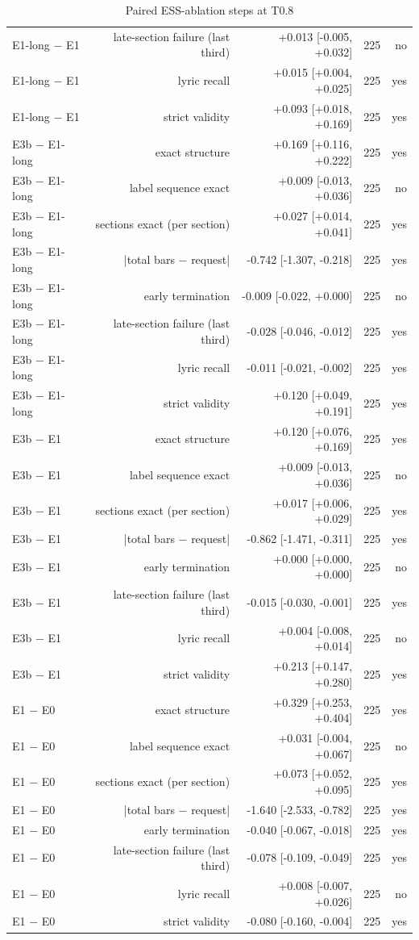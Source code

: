 \begin{table}[t]
\begin{tabular}{lrrrr}
E1-long $-$ E1 & late-section failure (last third) & +0.013 [-0.005, +0.032] & 225 & no \\
E1-long $-$ E1 & lyric recall & +0.015 [+0.004, +0.025] & 225 & yes \\
E1-long $-$ E1 & strict validity & +0.093 [+0.018, +0.169] & 225 & yes \\
E3b $-$ E1-long & exact structure & +0.169 [+0.116, +0.222] & 225 & yes \\
E3b $-$ E1-long & label sequence exact & +0.009 [-0.013, +0.036] & 225 & no \\
E3b $-$ E1-long & sections exact (per section) & +0.027 [+0.014, +0.041] & 225 & yes \\
E3b $-$ E1-long & |total bars $-$ request| & -0.742 [-1.307, -0.218] & 225 & yes \\
E3b $-$ E1-long & early termination & -0.009 [-0.022, +0.000] & 225 & no \\
E3b $-$ E1-long & late-section failure (last third) & -0.028 [-0.046, -0.012] & 225 & yes \\
E3b $-$ E1-long & lyric recall & -0.011 [-0.021, -0.002] & 225 & yes \\
E3b $-$ E1-long & strict validity & +0.120 [+0.049, +0.191] & 225 & yes \\
E3b $-$ E1 & exact structure & +0.120 [+0.076, +0.169] & 225 & yes \\
E3b $-$ E1 & label sequence exact & +0.009 [-0.013, +0.036] & 225 & no \\
E3b $-$ E1 & sections exact (per section) & +0.017 [+0.006, +0.029] & 225 & yes \\
E3b $-$ E1 & |total bars $-$ request| & -0.862 [-1.471, -0.311] & 225 & yes \\
E3b $-$ E1 & early termination & +0.000 [+0.000, +0.000] & 225 & no \\
E3b $-$ E1 & late-section failure (last third) & -0.015 [-0.030, -0.001] & 225 & yes \\
E3b $-$ E1 & lyric recall & +0.004 [-0.008, +0.014] & 225 & no \\
E3b $-$ E1 & strict validity & +0.213 [+0.147, +0.280] & 225 & yes \\
E1 $-$ E0 & exact structure & +0.329 [+0.253, +0.404] & 225 & yes \\
E1 $-$ E0 & label sequence exact & +0.031 [-0.004, +0.067] & 225 & no \\
E1 $-$ E0 & sections exact (per section) & +0.073 [+0.052, +0.095] & 225 & yes \\
E1 $-$ E0 & |total bars $-$ request| & -1.640 [-2.533, -0.782] & 225 & yes \\
E1 $-$ E0 & early termination & -0.040 [-0.067, -0.018] & 225 & yes \\
E1 $-$ E0 & late-section failure (last third) & -0.078 [-0.109, -0.049] & 225 & yes \\
E1 $-$ E0 & lyric recall & +0.008 [-0.007, +0.026] & 225 & no \\
E1 $-$ E0 & strict validity & -0.080 [-0.160, -0.004] & 225 & yes \\
\bottomrule
\end{tabular}
\caption{Paired ESS-ablation steps at T0.8}
\label{tab:ess_ablation_deltas_T08}
\end{table}

